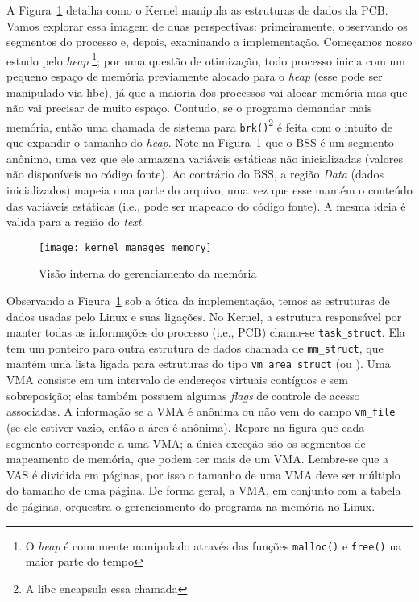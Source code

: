 A Figura~\ref{fig:kernel_manages_memory} detalha
como o Kernel manipula as estruturas de dados da PCB. Vamos explorar essa
imagem de duas perspectivas: primeiramente, observando os segmentos do processo
e, depois, examinando a implementação. Começamos nosso estudo pelo \textit{heap}
\footnote{O \emph{heap} é comumente manipulado através das funções \texttt{malloc()} e
\texttt{free()} na maior parte do tempo}; por uma questão de otimização, todo
processo inicia com um pequeno espaço de memória previamente alocado para o \textit{heap}
(esse pode ser manipulado via libc), já que a maioria dos
processos vai alocar memória mas que não vai precisar de muito espaço.
Contudo, se o programa demandar mais memória, então uma chamada de sistema para
\texttt{brk()}\footnote{A libc encapsula essa chamada} é feita com o intuito de
que expandir o tamanho do \textit{heap}. Note na
Figura~\ref{fig:kernel_manages_memory} que o BSS é um segmento anônimo, uma vez
que ele armazena variáveis estáticas não inicializadas (valores não disponíveis
no código fonte). Ao contrário do BSS, a região \emph{Data} (dados
inicializados) mapeia uma parte do arquivo, uma vez que esse mantém o conteúdo
das variáveis estáticas (i.e., pode ser mapeado do código fonte). A mesma ideia
é valida para a região do \textit{text}.

\begin{figure}[!h]
  \centering
  \texttt{[image: kernel\_manages\_memory]}
	\caption[Visão interna do gerenciamento da memória]{Visão interna do gerenciamento da memória~\citep{kernel_manage_mem}}
  \label{fig:kernel_manages_memory}
\end{figure}

Observando a Figura~\ref{fig:kernel_manages_memory} sob a ótica
da implementação, temos as estruturas de dados usadas pelo Linux e
suas ligações. No Kernel, a estrutura responsável por manter todas as
informações do processo (i.e., PCB) chama-se \texttt{task\_struct}. Ela tem um
ponteiro para outra estrutura de dados chamada de \texttt{mm\_struct}, que
mantém uma lista ligada para estruturas do tipo \texttt{vm\_area\_struct} (ou
). Uma VMA consiste em um intervalo de
endereços virtuais contíguos e sem sobreposição; elas também possuem algumas
\textit{flags} de controle de acesso associadas. A informação se a VMA é
anônima ou não vem do campo \texttt{vm\_file} (se ele estiver vazio, então a
área é anônima). Repare na figura que cada segmento corresponde a uma VMA; a
única exceção são os segmentos de mapeamento de memória, que podem ter mais de um
VMA. Lembre-se que a VAS é dividida em páginas, por isso o tamanho de uma VMA
deve ser múltiplo do tamanho de uma página. De forma geral, a VMA, em conjunto com a
tabela de páginas, orquestra o gerenciamento do programa na memória no Linux.

